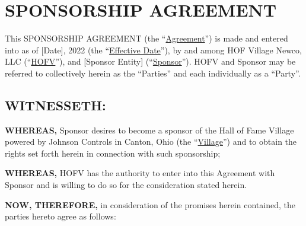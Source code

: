 \documentclass[]{article}
\begin{document}
\hypertarget{sponsorship-agreement}{%
\section{SPONSORSHIP AGREEMENT}\label{sponsorship-agreement}}

This SPONSORSHIP AGREEMENT (the ``\uline{Agreement}'') is made and
entered into as of {[}Date{]}, 2022 (the ``\uline{Effective Date}''), by
and among HOF Village Newco, LLC (``\uline{HOFV}''), and {[}Sponsor
Entity{]} (``\uline{Sponsor}''). HOFV and Sponsor may be referred to
collectively herein as the ``Parties'' and each individually as a
``Party''.

\hypertarget{witnesseth}{%
\subsection{WITNESSETH:}\label{witnesseth}}

\textbf{WHEREAS,} Sponsor desires to become a sponsor of the Hall of
Fame Village powered by Johnson Controls in Canton, Ohio (the
``\uline{Village}'') and to obtain the rights set forth herein in
connection with such sponsorship;

\textbf{WHEREAS,} HOFV has the authority to enter into this Agreement
with Sponsor and is willing to do so for the consideration stated
herein.

\textbf{NOW, THEREFORE,} in consideration of the promises herein
contained, the parties hereto agree as follows:
\end{document}
